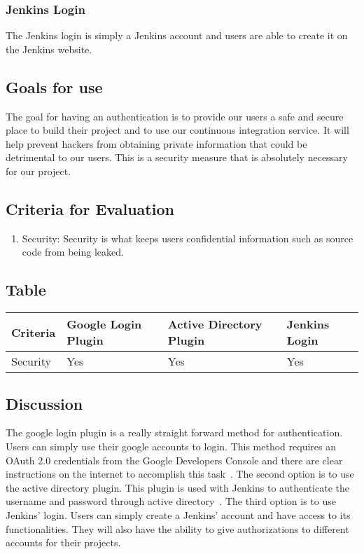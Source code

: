 \documentclass[10pt,letterpaper,onecolumn,journal]{IEEEtran}
\begin{document}
\subsubsection{Jenkins Login}
The Jenkins login is simply a Jenkins account and users are able to create it on the Jenkins website.
\subsection{Goals for use}
The goal for having an authentication is to provide our users a safe and secure place to build their project and to use our continuous integration service.
It will help prevent hackers from obtaining private information that could be detrimental to our users.
This is a security measure that is absolutely necessary for our project.
\subsection{Criteria for Evaluation}
\begin{enumerate}
  \item Security: Security is what keeps users confidential information such as source code from being leaked.
\end{enumerate}
\subsection{Table}
\begin{center}
  \begin{tabular}{llll}
    Criteria & Google Login Plugin & Active Directory Plugin & Jenkins Login\\ \midrule
    Security       & Yes & Yes & Yes \\ \midrule
  \end{tabular}
\end{center}
\subsection{Discussion}
The google login plugin is a really straight forward method for authentication.
Users can simply use their google accounts to login.
This method requires an OAuth 2.0 credentials from the Google Developers Console and there are clear instructions on the internet to accomplish this task~\cite{googlelogin}.
The second option is to use the active directory plugin.
This plugin is used with Jenkins to authenticate the username and password through active directory~\cite{activedirectory}.
The third option is to use Jenkins’ login.
Users can simply create a Jenkins’ account and have access to its functionalities.
They will also have the ability to give authorizations to different accounts for their projects.
\end{document}
